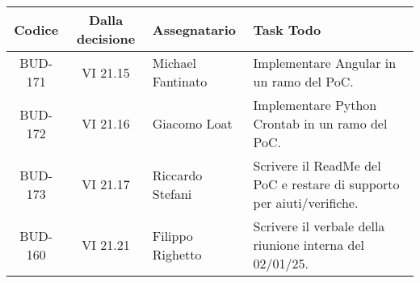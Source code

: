 \clearpage
\vspace*{-2cm} 
\begin{table}[t]
    \centering
    \begin{tabular}{|c|c|p{}|p{}|}
        \hline
        \rowcolor[gray]{0.75}
        \textbf{Codice} & \textbf{Dalla decisione} & \textbf{Assegnatario} & \textbf{Task Todo} \\
        \hline
        BUD-171 & VI 21.15 & Michael Fantinato & Implementare Angular in un ramo del PoC. \\
        \hline
        BUD-172 & VI 21.16 & Giacomo Loat& Implementare Python Crontab in un ramo del PoC. \\
        \hline
        BUD-173 & VI 21.17 & Riccardo Stefani & Scrivere il ReadMe del PoC e restare di supporto per aiuti/verifiche. \\
        \hline
        BUD-160 & VI 21.21 & Filippo Righetto & Scrivere il verbale della riunione interna del 02/01/25. \\
        \hline
    \end{tabular}
\end{table}